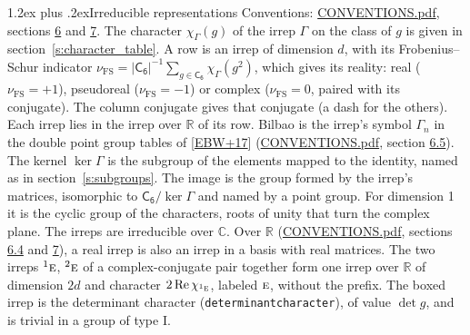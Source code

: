 \documentclass[10pt,a4paper]{article}
\makeatletter
\renewcommand\section{\@startsection{section}{1}{\z@}{-3ex plus -1ex minus -.2ex}%
  {1.2ex plus .2ex}{\normalfont\large\sffamily\bfseries\color{parttitle}}}
\numberwithin{equation}{section}
\newcommand{\grp}[1]{\mathsf{#1}}
\newcommand{\irr}[1]{\text{\normalfont\scshape #1}}
\newcommand{\conjpair}[1]{{}^{#1}}
\newcommand{\irchar}[1]{\chi_{#1}}
\newcommand{\fsind}{\nu_{\mathrm{FS}}}
\makeatother
\begin{document}
\section{Irreducible representations}\label{s:irreps}
Conventions: \href{../../CONVENTIONS.pdf}{CONVENTIONS.pdf}, sections \href{../../CONVENTIONS.pdf\#conv.6}{6} and \href{../../CONVENTIONS.pdf\#conv.7}{7}.
\leavevmode\label{n:function.character}\label{n:irrep.Gamma}The character $\irchar{\Gamma}(g)$ of the irrep $\Gamma$ on the class of $g$ is given in section~\ref{s:character_table}.
\leavevmode\label{n:index.dimension}\label{n:index.frobenius}\label{n:head.irrep}\label{n:head.reality}A row is an irrep of dimension $d$, with its Frobenius--Schur indicator $\fsind = |\grp{C_{6}}|^{-1}\allowbreak\sum_{g\in\grp{C_{6}}}\irchar{\Gamma}(g^2)$, which gives its reality: real ($\fsind = +1$), pseudoreal ($\fsind = -1$) or complex ($\fsind = 0$, paired with its conjugate). \label{n:head.conjugate}The column conjugate gives that conjugate (a dash for the others). \label{n:head.over.real}Each irrep lies in the irrep over $\mathbb{R}$ of its row. \label{n:head.bilbao}\label{n:irrep.alias.gamma}Bilbao is the irrep's symbol $\Gamma_n$ in the double point group tables of [\href{../../../REFERENCES.pdf\#ref.EBW+17}{EBW+17}] (\href{../../CONVENTIONS.pdf}{CONVENTIONS.pdf}, section \href{../../CONVENTIONS.pdf\#conv.6.5}{6.5}). \label{n:head.kernel}The kernel $\ker\Gamma$ is the subgroup of the elements mapped to the identity, named as in section~\ref{s:subgroups}. \label{n:head.image}The image is the group formed by the irrep's matrices, isomorphic to $\grp{C_{6}}/\ker\Gamma$ and named by a point group. For dimension 1 it is the cyclic group of the characters, roots of unity that turn the complex plane. The irreps are irreducible over $\mathbb{C}$. Over $\mathbb{R}$ (\href{../../CONVENTIONS.pdf}{CONVENTIONS.pdf}, sections \href{../../CONVENTIONS.pdf\#conv.6.4}{6.4} and \href{../../CONVENTIONS.pdf\#conv.7}{7}), a real irrep is also an irrep in a basis with real matrices. The two irreps $\conjpair{1}\irr{e}$, $\conjpair{2}\irr{e}$ of a complex-conjugate pair together form one irrep over $\mathbb{R}$ of dimension $2d$ and character $2\operatorname{Re}\irchar{\conjpair{1}\irr{e}}$, labeled $\irr{e}$, without the prefix. \label{n:mark.determinant}The boxed irrep is the determinant character (\texttt{determinantcharacter}), of value $\det g$, and is trivial in a group of type I.
\setlength{\emergencystretch}{2em}\par\setlength{\emergencystretch}{0pt}
\end{document}
